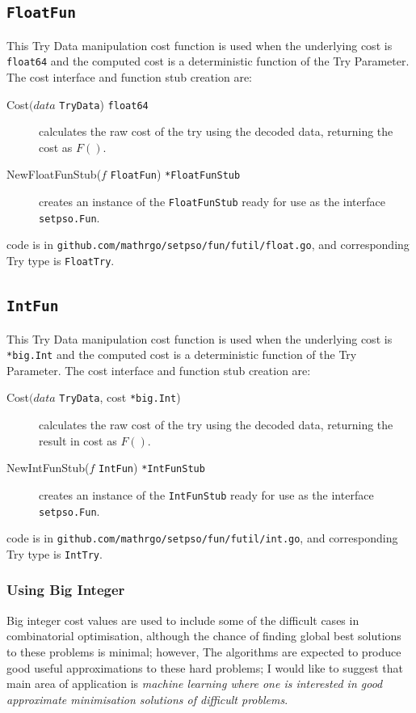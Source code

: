 \documentclass[a4paper,oneside,english]{book}
\numberwithin{equation}{section}
\numberwithin{figure}{section}
\newcommand{\codesorc}[1]{\texttt{github.com/mathrgo/setpso/#1}}
\begin{document}
\subsection{\texttt{FloatFun}}
This  Try Data manipulation cost function is used when the underlying cost is  \texttt{float64} and the computed cost is a deterministic function of the Try Parameter. The cost interface and function stub creation  are:
\begin{description}
	\item[Cost$ (data $ \texttt{TryData}) \texttt{float64}] calculates the raw cost of the try using the decoded data, returning  the cost as $F()$.
	\item[NewFloatFunStub($ f $ \texttt{FloatFun}) \texttt{*FloatFunStub} ] creates an instance of the \texttt{FloatFunStub} ready for use as the interface \texttt{setpso.Fun}. 
\end{description}  
code is in \codesorc{fun/futil/float.go}, and corresponding Try type is \texttt{FloatTry}.

\subsection{\texttt{IntFun}}
This  Try Data manipulation cost function is used when the underlying cost is  \texttt{*big.Int} and the computed cost is a deterministic function of the Try Parameter. The cost interface and function stub creation  are:
\begin{description}
	\item[Cost$ (data $ \texttt{TryData}, cost \texttt{*big.Int})] calculates the raw cost of the try using the decoded data, returning  the result in cost as $F()$.
	\item[NewIntFunStub($ f $ \texttt{IntFun}) \texttt{*IntFunStub} ] creates an instance of the \texttt{IntFunStub} ready for use as the interface \texttt{setpso.Fun}. 
\end{description}  
code is in \codesorc{fun/futil/int.go}, and corresponding Try type is \texttt{IntTry}.
\subsubsection{Using Big Integer}
Big integer cost values are used to include some of the difficult cases in combinatorial optimisation, although the chance of finding global best solutions to these problems is minimal; however, The algorithms are expected to produce good useful approximations to these hard problems; I would like to suggest that main area of application is \emph{machine learning where one is interested in good approximate minimisation solutions of difficult problems}.
\end{document}
